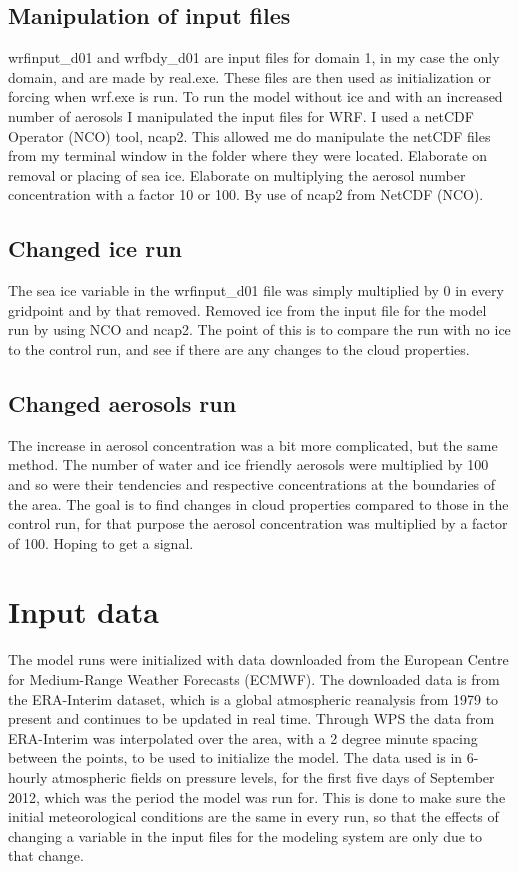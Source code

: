 \subsection{Manipulation of input files}
wrfinput\_d01 and wrfbdy\_d01 are input files for domain 1, in my case the only domain, and are made by real.exe. These files are then used as initialization or forcing when wrf.exe is run.
To run the model without ice and with an increased number of aerosols I manipulated the input files for WRF. I used a netCDF Operator (NCO) tool, ncap2. This allowed me do manipulate the netCDF files from my terminal window in the folder where they were located.
Elaborate on removal or placing of sea ice. Elaborate on multiplying the aerosol number concentration with a factor 10 or 100. By use of ncap2 from NetCDF (NCO).

\subsection{Changed ice run}
The sea ice variable in the wrfinput\_d01 file was simply multiplied by 0 in every gridpoint and by that removed.
Removed ice from the input file for the model run by using NCO and ncap2. The point of this is to compare the run with no ice to the control run, and see if there are any changes to the cloud properties.

\subsection{Changed aerosols run}
The increase in aerosol concentration was a bit more complicated, but the same method. The number of water and ice friendly aerosols were multiplied by 100 and so were their tendencies and respective concentrations at the boundaries of the area. %
The goal is to find changes in cloud properties compared to those in the control run, for that purpose the aerosol concentration was multiplied by a factor of 100. Hoping to get a signal.

\section{Input data}
\label{sec:inputdata}
The model runs were initialized with data downloaded from the European Centre for Medium-Range Weather Forecasts (ECMWF).%
The downloaded data is from the ERA-Interim dataset, which is a global atmospheric reanalysis from 1979 to present and continues to be updated in real time.%
Through WPS the data from ERA-Interim was interpolated over the area, with a 2 degree minute spacing between the points, to be used to initialize the model. The data used is in 6-hourly atmospheric fields on pressure levels, for the first five days of September 2012, which was the period the model was run for. This is done to make sure the initial meteorological conditions are the same in every run, so that the effects of changing a variable in the input files for the modeling system are only due to that change.

